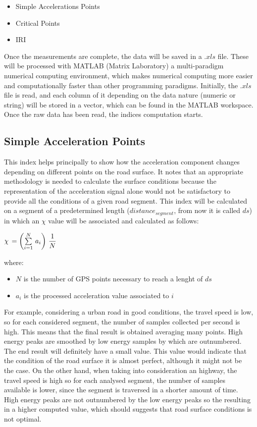 \documentclass[tesi]{subfiles}
\begin{document}
 \begin{itemize}
 \item Simple Accelerations Points
 \item Critical Points
 \item IRI
 \end{itemize}
 
Once the measurements are complete, the data will be saved in a $.xls$ file.
These will be processed with MATLAB (Matrix Laboratory) a multi-paradigm numerical computing environment, which makes numerical computing more easier and computationally faster than other programming paradigms.
Initially, the $.xls$ file is read, and each column of it depending on the data nature (numeric or string) will be stored in a vector, which can be found in the MATLAB workspace.
Once the raw data has been read, the indices computation starts.

\clearpage
\subsection{Simple Acceleration Points}\label{ssc:Simple Accelerations Points}
This index helps principally to show how the acceleration component changes depending on different points on the road surface.
It notes that an appropriate methodology is needed to calculate the surface conditions because the representation of the acceleration signal alone would not be satisfactory to provide all the conditions of a given road segment. This index will be calculated on a segment of a predetermined length ($distance_{segment}$, from now it is called $ds$) in which an $\chi$ value will be associated and calculated as follows:

\begin{center}
{\large  $\chi \thinspace = \left( \sum \limits_{i=1}^{N} \thinspace a_{i} \right) \thinspace \dfrac{1}{N}$}
\end{center}\label{eq:sap}
where:
\begin{itemize}
\item $N$ is the number of GPS points necessary to reach a lenght of $ds$
\item $a_{i}$ is the processed acceleration value associated to $i$
\end{itemize}

For example, considering a urban road in good conditions, the travel speed is low, so for each considered segment, the number of samples collected per second is high.
This means that the final result is obtained averaging many points.
High energy peaks are smoothed by low energy samples by which are outnumbered.
The end result will definitely have a small value.
This value would indicate that the condition of the road surface it is almost perfect, although it might not be the case.
On the other hand, when taking into consideration an highway, the travel speed is  high so for each analysed segment, the number of samples available is lower, since the segment is traversed in a shorter amount of time.
High energy peaks are not outnumbered by the low energy peaks so the resulting in a higher computed value, which should suggests that road surface conditions is not optimal.
\end{document}
